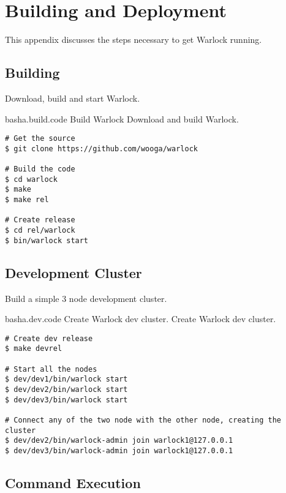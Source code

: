 \chapter{Building and Deployment}
\label{appendix:building.deployment}

This appendix discusses the steps necessary to get Warlock running.%

\section{Building}

Download, build and start Warlock.

\begin{scode}{bash}{a.build.code}{%
  Build Warlock}{%
  Download and build Warlock.}
  \begin{lstlisting}
# Get the source
$ git clone https://github.com/wooga/warlock

# Build the code
$ cd warlock
$ make
$ make rel

# Create release
$ cd rel/warlock
$ bin/warlock start
  \end{lstlisting}
\end{scode}

\section{Development Cluster}

Build a simple 3 node development cluster.

\begin{scode}{bash}{a.dev.code}{%
  Create Warlock dev cluster.}{%
  Create Warlock dev cluster.}
  \begin{lstlisting}
# Create dev release
$ make devrel

# Start all the nodes
$ dev/dev1/bin/warlock start
$ dev/dev2/bin/warlock start
$ dev/dev3/bin/warlock start

# Connect any of the two node with the other node, creating the cluster
$ dev/dev2/bin/warlock-admin join warlock1@127.0.0.1
$ dev/dev3/bin/warlock-admin join warlock1@127.0.0.1
  \end{lstlisting}
\end{scode}

\section{Command Execution}


